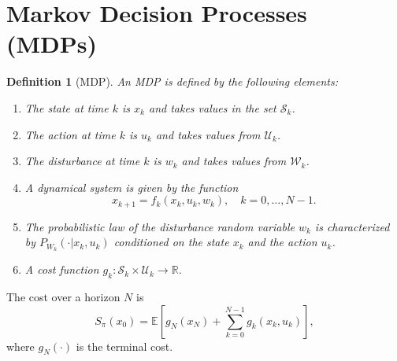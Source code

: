 \documentclass[a4 paper]{article}
\numberwithin{equation}{section}
\theoremstyle{boldStyle}
\theoremstyle{boldBlueStyle}
\theoremstyle{boldPurpleStyle}
\theoremstyle{boldRedStyle}
\newtheorem{definition}{Definition}[section]
\begin{document}
\newpage
\section{Markov Decision Processes (MDPs)}

\begin{definition}[MDP]
  An MDP is defined by the following elements:
  \begin{enumerate}
    \item The state at time \( k \) is \( x_k \) and takes values in the set \( \mathcal{S}_k \).
    \item The action at time \( k \) is \( u_k \) and takes values from \( \mathcal{U}_k \).
    \item The disturbance at time \( k \) is \( w_k \) and takes values from \( \mathcal{W}_k \).
    \item A dynamical system is given by the function
      \begin{equation}
        x_{k+1} = f_k(x_k, u_k, w_k), \quad k = 0, \ldots, N-1.
      \end{equation}
    \item The probabilistic law of the disturbance random variable \( w_k \) is characterized by \( P_{W_k}(\cdot | x_k, u_k) \) conditioned on the state \( x_k \) and the action \( u_k \).
    \item A cost function \( g_k : \mathcal{S}_k \times \mathcal{U}_k \to \mathbb{R} \).
  \end{enumerate}
\end{definition}

The cost over a horizon \( N \) is
\begin{equation}
  S_\pi(x_0) = \mathbb{E}[g_N(x_N) + \sum_{k=0}^{N-1} g_k(x_k, u_k)],
\end{equation}
where \( g_N(\cdot) \) is the terminal cost.
\end{document}
